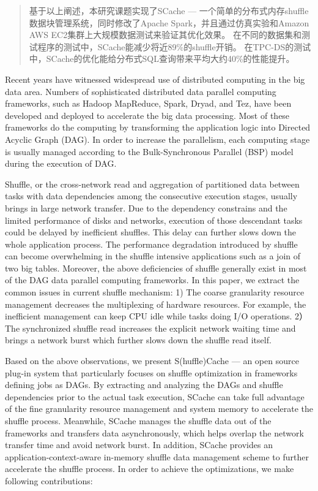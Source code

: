 \begin{abstract}
基于以上阐述，本研究课题实现了SCache --- 一个简单的分布式内存shuffle数据块管理系统，同时修改了Apache Spark，并且通过仿真实验和Amazon AWS EC2集群上大规模数据测试来验证其优化效果。
在不同的数据集和测试程序的测试中，SCache能减少将近89\%的shuffle开销。
在TPC-DS的测试中，SCache的优化能给分布式SQL查询带来平均大约40\%的性能提升。

\end{abstract}

\begin{englishabstract}

Recent years have witnessed widespread use of distributed computing in the big data area.
Numbers of sophisticated distributed data parallel computing frameworks, such as Hadoop MapReduce\cite{hadoop}, Spark\cite{spark}, Dryad\cite{dryad}, and Tez\cite{tez},
have been developed and deployed to accelerate the big data processing.
Most of these frameworks do the computing by transforming the application logic into Directed Acyclic Graph (DAG).
In order to increase the parallelism, each computing stage is usually managed according to the Bulk-Synchronous Parallel (BSP) model during the execution of DAG.

Shuffle, or the cross-network read and aggregation of partitioned data between tasks with data dependencies among the consecutive execution stages, 
usually brings in large network transfer. 
Due to the dependency constrains and the limited performance of disks and networks, execution of those descendant tasks could be delayed by inefficient shuffles. 
This delay can further slows down the whole application process. 
The performance degradation introduced by shuffle can become overwhelming in the shuffle intensive applications such as a join of two big tables.
Moreover, the above deficiencies of shuffle generally exist in most of the DAG data parallel computing frameworks. 
In this paper, we extract the common issues in current shuffle mechanism: 
1) The coarse granularity resource management decreases the multiplexing of hardware resources. For example, the inefficient management can keep CPU idle while tasks doing I/O operations.
2）The synchronized shuffle read increases the explicit network waiting time and brings a network burst which further slows down the shuffle read itself.

Based on the above observations, we present S(huffle)Cache --- an open source plug-in system that particularly focuses on shuffle optimization in frameworks defining jobs as DAGs. 
By extracting and analyzing the DAGs and shuffle dependencies prior to the actual task execution, 
SCache can take full advantage of the fine granularity resource management and system memory to accelerate the shuffle process. 
Meanwhile, SCache manages the shuffle data out of the frameworks and transfers data asynchronously, which helps overlap the network transfer time and avoid network burst.
In addition, SCache provides an application-context-aware in-memory shuffle data management scheme to further accelerate the shuffle process.  
In order to achieve the optimizations, we make following contributions:


\end{englishabstract}
